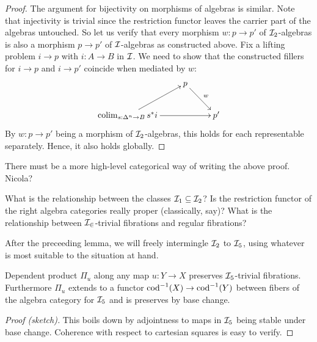 \documentclass[reqno,10pt,a4paper,oneside]{amsart}
\begin{document}
\begin{proof}
The argument for bijectivity on morphisms of algebras is similar.
Note that injectivity is trivial since the restriction functor leaves the carrier part of the algebras untouched.
So let us verify that every morphism $w : p \to p'$ of $\cal{I}_2$-algebras is also a morphism $p \to p'$ of $\cal{I}$-algebras as constructed above.
Fix a lifting problem $i \to p$ with $i : A \to B$ in $\cal{I}$.
We need to show that the constructed fillers for $i \to p$ and $i \to p'$ coincide when mediated by $w$:
\[
\xymatrix{
&
  p
  \ar[dr]^{w}
\\
  \colim_{s : \Delta^n \to B} s^* i
  \ar[ur]
  \ar[rr]
&&
  p'
}
\]
By $w : p \to p'$ being a morphism of $\cal{I}_2$-algebras, this holds for each representable separately.
Hence, it also holds globally.
\end{proof}

\begin{question}
There must be a more high-level categorical way of writing the above proof.
Nicola?
\end{question}

\begin{question}
What is the relationship between the classes $\cal{I}_1 \subseteq \cal{I}_2$? 
Is the restriction functor of the right algebra categories really proper (classically, say)?
What is the relationship between $\cal{I_2}$-trivial fibrations and regular fibrations?
\end{question}

After the preceeding lemma, we will freely intermingle $\cal{I}_2$ to $\cal{I}_5$, using whatever is most suitable to the situation at hand.

\begin{lemma}
Dependent product $\Pi_u$ along any map $u : Y \to X$ preserves $\cal{I}_5$-trivial fibrations.
Furthermore $\Pi_u$ extends to a functor $\cod^{-1}(X) \to \cod^{-1}(Y)$ between fibers of the algebra category for $\cal{I}_5$ and is preserves by base change.
\end{lemma}

\begin{proof}[Proof (sketch)]
This boils down by adjointness to maps in $\cal{I}_5$ being stable under base change.
Coherence with respect to cartesian squares is easy to verify.
\begin{comment}
Fix an arbitrary map $u : Y \to X$ and let $q : Z \to Y$ be a uniform trivial fibration.
We want to show that $\Pi_u q : \Pi_u Z \to Y$ is a uniform trivial fibration.
Coherently solving a lifting problem $(s, t) : i \to \Pi_u q$ with $i : \cal{I}$ is equivalent to coherently solving $u^*(i) \pitchfork q$ where $u^*(i) : u^* A \to u^* B$.

\[
\xymatrix{
  A'''
  \ar[rr]
  \ar[dd]
  \ar[dr]
&&
  A''
  \ar[rr]
  \ar[dd]
  \ar[dr]
&&
  Z
  \ar[dd]
\\&
  A'
  \ar[rr]
  \ar[dd]
  \pullback{dr}
&&
  A
  \ar[rr]
  \ar[dd]
&&
  \Pi_u Z
  \ar[dd]
\\
  B'''
  \ar[rr]
  \ar[dr]
&&
  B''
  \ar[rr]
  \ar[dr]
&&
  Y
  \ar[dr]
\\&
  \Delta^{n'}
  \ar[rr]
&&
  \Delta^n
  \ar[rr]
&&
  X
}
\]
\end{comment}
\end{proof}
\end{document}
